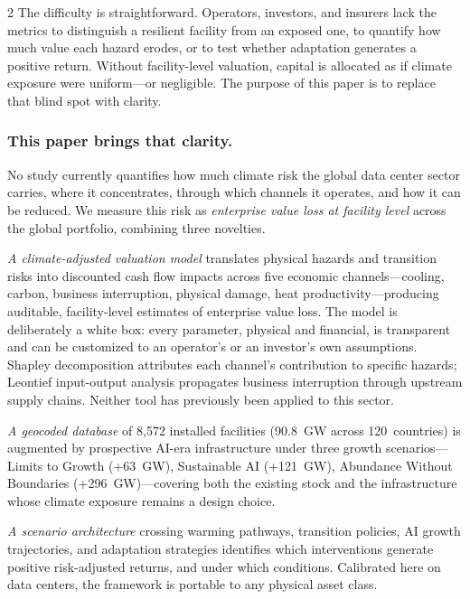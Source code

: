 \begin{multicols}{2}
The difficulty is straightforward. Operators, investors, and insurers lack the metrics to distinguish a resilient facility from an exposed one, to quantify how much value each hazard erodes, or to test whether adaptation generates a positive return. Without facility-level valuation, capital is allocated as if climate exposure were uniform---or negligible. The purpose of this paper is to replace that blind spot with clarity.

\subsubsection*{\textcolor{SEGreen}{This paper brings that clarity.}}

\noindent No study currently quantifies how much climate risk the global data center sector carries, where it concentrates, through which channels it operates, and how it can be reduced. We measure this risk as \textit{enterprise value loss at facility level} across the global portfolio, combining three novelties.

\textit{A climate-adjusted valuation model} translates physical hazards and transition risks into discounted cash flow impacts across five economic channels---cooling, carbon, business interruption, physical damage, heat productivity---producing auditable, facility-level estimates of enterprise value loss. The model is deliberately a white box: every parameter, physical and financial, is transparent and can be customized to an operator's or an investor's own assumptions. Shapley decomposition attributes each channel's contribution to specific hazards; Leontief input-output analysis propagates business interruption through upstream supply chains. Neither tool has previously been applied to this sector.

\textit{A geocoded database} of 8{,}572 installed facilities (90.8~GW across 120~countries) is augmented by prospective AI-era infrastructure under three growth scenarios---Limits to Growth (+63~GW), Sustainable AI (+121~GW), Abundance Without Boundaries (+296~GW)---covering both the existing stock and the infrastructure whose climate exposure remains a design choice.

\textit{A scenario architecture} crossing warming pathways, transition policies, AI growth trajectories, and adaptation strategies identifies which interventions generate positive risk-adjusted returns, and under which conditions. Calibrated here on data centers, the framework is portable to any physical asset class.


\end{multicols}
